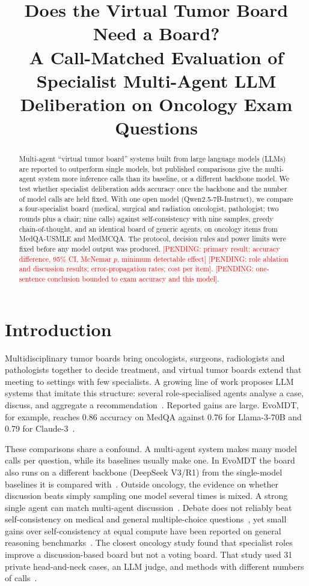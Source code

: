 \IfFileExists{IEEEtran.cls}{\documentclass[conference]{IEEEtran}}{\documentclass[10pt,twocolumn]{article}\usepackage[margin=0.75in]{geometry}}
\title{Does the Virtual Tumor Board Need a Board?\\ A Call-Matched Evaluation of Specialist Multi-Agent LLM Deliberation on Oncology Exam Questions}
\author{\IEEEauthorblockN{Vibhum Sharma}\IEEEauthorblockA{Department of Information Technology, Indian Institute of Information Technology Allahabad, India}}
\newcommand{\pending}[1]{\textcolor{red}{[PENDING: #1]}}
\begin{document}
\maketitle

\begin{abstract}
Multi-agent ``virtual tumor board'' systems built from large language models (LLMs) are reported to outperform single models, but published comparisons give the multi-agent system more inference calls than its baseline, or a different backbone model. We test whether specialist deliberation adds accuracy once the backbone and the number of model calls are held fixed. With one open model (Qwen2.5-7B-Instruct), we compare a four-specialist board (medical, surgical and radiation oncologist, pathologist; two rounds plus a chair; nine calls) against self-consistency with nine samples, greedy chain-of-thought, and an identical board of generic agents, on oncology items from MedQA-USMLE and MedMCQA. The protocol, decision rules and power limits were fixed before any model output was produced. \pending{primary result: accuracy difference, 95\% CI, McNemar $p$, minimum detectable effect} \pending{role ablation and discussion results; error-propagation rates; cost per item}. \pending{one-sentence conclusion bounded to exam accuracy and this model}.
\end{abstract}

\section{Introduction}
Multidisciplinary tumor boards bring oncologists, surgeons, radiologists and pathologists together to decide treatment, and virtual tumor boards extend that meeting to settings with few specialists. A growing line of work proposes LLM systems that imitate this structure: several role-specialised agents analyse a case, discuss, and aggregate a recommendation~\cite{liu2025evomdt,han2025consensus,kim2025mlhc}. Reported gains are large. EvoMDT, for example, reaches 0.86 accuracy on MedQA against 0.76 for Llama-3-70B and 0.79 for Claude-3~\cite{liu2025evomdt}.

These comparisons share a confound. A multi-agent system makes many model calls per question, while its baselines usually make one. In EvoMDT the board also runs on a different backbone (DeepSeek V3/R1) from the single-model baselines it is compared with~\cite{liu2025evomdt}. Outside oncology, the evidence on whether discussion beats simply sampling one model several times is mixed. A strong single agent can match multi-agent discussion~\cite{wang2024rethinking}. Debate does not reliably beat self-consistency on medical and general multiple-choice questions~\cite{smit2023mad}, yet small gains over self-consistency at equal compute have been reported on general reasoning benchmarks~\cite{wunderlich2026pareto}. The closest oncology study found that specialist roles improve a discussion-based board but not a voting board. That study used 31 private head-and-neck cases, an LLM judge, and methods with different numbers of calls~\cite{kim2025mlhc}.
\end{document}
